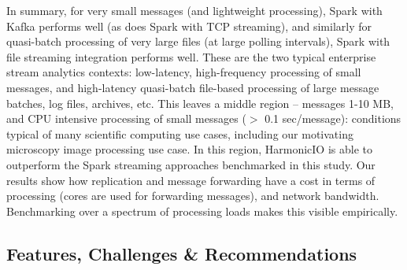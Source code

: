 \documentclass[conference]{IEEEtran}
\begin{document}
In summary, for very small messages (and lightweight processing), Spark with Kafka performs well (as does Spark with TCP streaming), and similarly for quasi-batch processing of very large files (at large polling intervals), Spark with file streaming integration performs well. These are the two typical enterprise stream analytics contexts: low-latency, high-frequency processing of small messages, and high-latency quasi-batch file-based processing of large message batches, log files, archives, etc.
This leaves a middle region -- messages 1-10 MB, and CPU intensive processing of small messages ($>$ 0.1 sec/message): conditions typical of many scientific computing use cases, including our motivating microscopy image processing use case. In this region, HarmonicIO is able to outperform the Spark streaming approaches benchmarked in this study. 
Our results show how replication and message forwarding have a cost in terms of processing (cores are used for forwarding messages), and network bandwidth. Benchmarking over a spectrum of processing loads makes this visible empirically.







\subsection{Features, Challenges \& Recommendations}\label{challenges}
\end{document}

